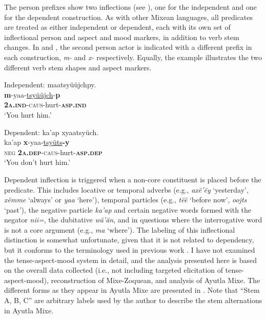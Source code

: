 \documentclass[output=paper,colorlinks,citecolor=brown,draft]{langscibook}
\begin{document}
\largerpage[2]
The person prefixes show two inflections (see ), one for the independent and one for the dependent construction. As with other Mixean languages, all predicates are treated as either independent or dependent, each with its own set of inflectional person and aspect and mood markers, in addition to verb stem changes. In  and , the second person actor is indicated with a different prefix in each construction, \textit{m-} and \textit{x-} respectively. Equally, the example illustrates the two different verb stem shapes and aspect markers.

{\ea\label{ex:mix:2}
    \ea\label{ex:mix:2a}Independent:\newline
        \glll maatsyüüjchpy. \\ 
              \textbf{m}{}-yaa-\uline{tsyüüjch}-\textbf{p} \\
              \textbf{\textsc{2a.ind}}\textsc{{}-caus-}hurt-\textbf{\textsc{asp.ind}} \\
        \glt ‘You hurt him.’ 
    

    \ex\label{ex:mix:2b}Dependent:\newline 
        \glll ka’ap xyaatsyüch. \\
              ka’ap \textbf{x}{}-yaa-\uline{tsyüts}\textbf{-y} \\
             \textsc{neg} \textbf{\textsc{2a.dep}}\textsc{-caus}-hurt-\textbf{\textsc{asp.dep}} \\
        \glt ‘You don’t hurt him.’
    \z
\z }

Dependent inflection is triggered when a non\nobreakdash-core constituent is placed before the predicate. This includes locative or temporal adverbs (e.g., \textit{axë’ëy} ‘yesterday’, \textit{xëmme} ‘always’ or \textit{yaa} ‘here’), temporal particles (e.g., \textit{tëë} ‘before now’, \textit{oojts} ‘past’), the negative particle \textit{ka’ap} and certain negative words formed with the negator \textit{nii=}, the dubitative \textit{wä’än}, and in questions where the interrogative word is not a core argument (e.g., \textit{ma} ‘where’). The labeling of this inflectional distinction is somewhat unfortunate, given that it is not related to dependency, but it conforms to the terminology used in previous work \citep{Romero-Méndez2009,Wichmann1995}. I have not examined the tense-aspect-mood system in detail, and the analysis presented here is based on the overall data collected (i.e., not including targeted elicitation of tense-aspect-mood),  reconstruction of Mixe-Zoquean, and  analysis of Ayutla Mixe. The different forms as they appear in Ayutla Mixe are presented in . Note that “Stem A, B, C” are arbitrary labels used by the author to describe the stem alternations in Ayutla Mixe.
\end{document}
